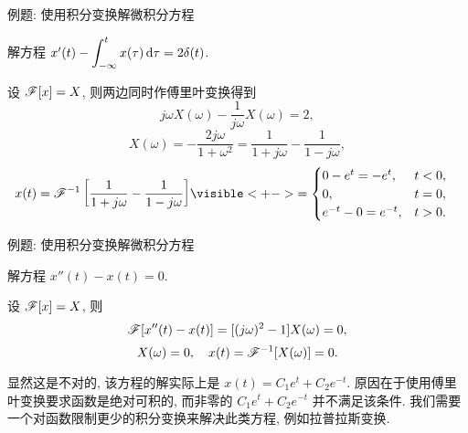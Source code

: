 \begin{frame}{例题: 使用积分变换解微积分方程}
\beqskip{0pt}
\begin{example}
解方程 $x'(t)-\displaystyle\int_{-\infty}^t x(\tau)\,\mathrm{d} \tau=2\delta(t)$.
\end{example}
\begin{solution}
设 $\mathscr{F}[x]=X$, 则两边同时作傅里叶变换得到
\onslide<+->
\[j\omega X(\omega)-\frac1{j\omega}X(\omega)=2,\]
\onslide<+->
\[X(\omega)=-\frac{2j\omega}{1+\omega^2}=\frac1{1+j\omega}-\frac1{1-j\omega},\]
\onslide<+->
\begin{align*}
x(t)=\msf^{-1}\left[\frac1{1+j\omega}-\frac1{1-j\omega}\right]
&\visible<+->{=\begin{cases}
0-e^t=-e^t,&t<0,\\
0,&t=0,\\
e^{-t}-0=e^{-t},&t>0.
\end{cases}}
\end{align*}
\end{solution}
\vspace{-1pt}
\endgroup
\end{frame}


\begin{frame}{例题: 使用积分变换解微积分方程}
\beqskip{8pt}
\begin{example}
解方程 $x''(t)-x(t)=0$.
\end{example}
\begin{solution}
设 $\mathscr{F}[x]=X$,
\onslide<+->
则
\[\mathscr{F}[x''(t)-x(t)]=[(j\omega)^2-1]X(\omega)=0,\]%
\onslide<+->
\vspace{-\baselineskip}
\[X(\omega)=0,\quad x(t)=\mathscr{F}^{-1}[X(\omega)]=0.\]
\end{solution}
\onslide<+->
显然这是不对的, 该方程的解实际上是 $x(t)=C_1e^t+C_2e^{-t}$.
\onslide<+->
原因在于使用傅里叶变换要求函数是绝对可积的, 而非零的 $C_1e^t+C_2e^{-t}$ 并不满足该条件.
\onslide<+->
我们需要一个对函数限制更少的积分变换来解决此类方程, 例如拉普拉斯变换.
\endgroup
\end{frame}

